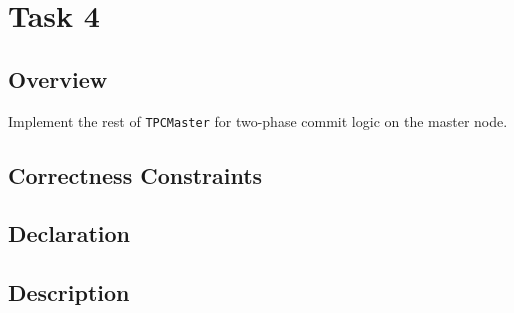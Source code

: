 \documentclass{article}
\begin{document}
\section{Task 4}
\subsection{Overview}
Implement the rest of \texttt{TPCMaster} for two-phase commit logic on the master node.
\subsection{Correctness Constraints}
\subsection{Declaration}
\subsection{Description}
\end{document}
